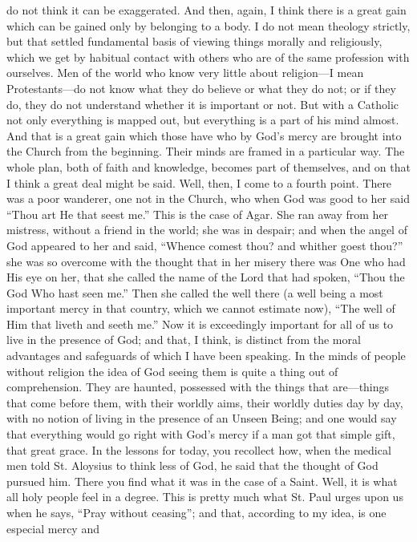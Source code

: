 do not think it can be exaggerated. And then, again, I think there is
a great gain which can be gained only by belonging to a body. I do not
mean theology strictly, but that settled fundamental basis of viewing
things morally and religiously, which we get by habitual contact with
others who are of the same profession with ourselves. Men of the world
who know very little about religion—I mean Protestants—do not know
what they do believe or what they do not; or if they do, they do not
understand whether it is important or not. But with a Catholic not
only everything is mapped out, but everything is a part of his mind
almost. And that is a great gain which those have who by God's mercy
are brought into the Church from the beginning. Their minds are framed
in a particular way. The whole plan, both of faith and knowledge,
becomes part of themselves, and on that I think a great deal might be
said. Well, then, I come to a fourth point. There was a poor wanderer,
one not in the Church, who when God was good to her said ``Thou art He
that seest me.'' This is the case of Agar. She ran away from her
mistress, without a friend in the world; she was in despair; and when
the angel of God appeared to her and said, ``Whence comest thou? and
whither goest thou?'' she was so overcome with the thought that in her
misery there was One who had His eye on her, that she called the name
of the Lord that had spoken, ``Thou the God Who hast seen me.'' Then she
called the well there (a well being a most important mercy in that
country, which we cannot estimate now), ``The well of Him that liveth
and seeth me.'' Now it is exceedingly important for all of us to live
in the presence of God; and that, I think, is distinct from the moral
advantages and safeguards of which I have been speaking. In the minds
of people without religion the idea of God seeing them is quite a
thing out of comprehension. They are haunted, possessed with the
things that are—things that come before them, with their worldly
aims, their worldly duties day by day, with no notion of living in the
presence of an Unseen Being; and one would say that everything would
go right with God's mercy if a man got that simple gift, that great
grace. In the lessons for today, you recollect how, when the
medical men told St. Aloysius to think less of God, he said that the
thought of God pursued him. There you find what it was in the case of
a Saint. Well, it is what all holy people feel in a degree. This is
pretty much what St. Paul urges upon us when he says, ``Pray without
ceasing''; and that, according to my idea, is one especial mercy and
